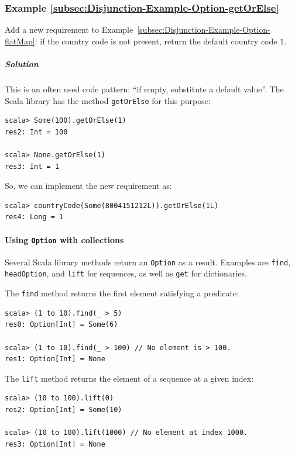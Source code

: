 \subsubsection{Example \label{subsec:Disjunction-Example-Option-getOrElse}\ref{subsec:Disjunction-Example-Option-getOrElse}}

Add a new requirement to Example~\ref{subsec:Disjunction-Example-Option-flatMap}:
if the country code is not present, return the default country code
$1$.

\subparagraph{Solution}

This is an often used code pattern: \textsf{``}if empty, substitute a default
value\textsf{''}. The Scala library has the method \lstinline!getOrElse!
for this purpose:
\begin{lstlisting}
scala> Some(100).getOrElse(1)
res2: Int = 100

scala> None.getOrElse(1)
res3: Int = 1
\end{lstlisting}
So, we can implement the new requirement as:
\begin{lstlisting}
scala> countryCode(Some(8004151212L)).getOrElse(1L)
res4: Long = 1
\end{lstlisting}


\paragraph{Using \texttt{Option} with collections}

Several Scala library methods return an \lstinline!Option! as a result.
Examples are \lstinline!find!, \lstinline!headOption!, and \lstinline!lift!
for sequences, as well as \lstinline!get! for dictionaries.

The \lstinline!find! method returns the first element satisfying
a predicate:
\begin{lstlisting}
scala> (1 to 10).find(_ > 5)
res0: Option[Int] = Some(6)

scala> (1 to 10).find(_ > 100) // No element is > 100.
res1: Option[Int] = None
\end{lstlisting}

The \lstinline!lift! method returns the element of a sequence at
a given index:
\begin{lstlisting}
scala> (10 to 100).lift(0)
res2: Option[Int] = Some(10)

scala> (10 to 100).lift(1000) // No element at index 1000.
res3: Option[Int] = None
\end{lstlisting}

